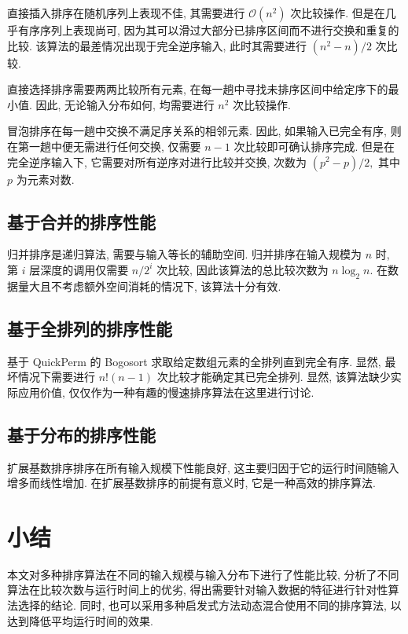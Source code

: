 \documentclass[12pt]{article}
\begin{document}
直接插入排序在随机序列上表现不佳, 其需要进行 $\mathcal{O}(n^2)$ 次比较操作. 但是在几乎有序序列上表现尚可, 因为其可以滑过大部分已排序区间而不进行交换和重复的比较. 该算法的最差情况出现于完全逆序输入, 此时其需要进行 $(n^2 - n) / 2$ 次比较.

直接选择排序需要两两比较所有元素, 在每一趟中寻找未排序区间中给定序下的最小值. 因此, 无论输入分布如何, 均需要进行 $n^2$ 次比较操作.

冒泡排序在每一趟中交换不满足序关系的相邻元素. 因此, 如果输入已完全有序, 则在第一趟中便无需进行任何交换, 仅需要 $n - 1$ 次比较即可确认排序完成. 但是在完全逆序输入下, 它需要对所有逆序对进行比较并交换, 次数为 $(p^2 - p) / 2,$ 其中 $p$ 为元素对数.

\subsection{基于合并的排序性能}

归并排序是递归算法, 需要与输入等长的辅助空间. 归并排序在输入规模为 $n$ 时, 第 $i$ 层深度的调用仅需要 $n / 2^i$ 次比较, 因此该算法的总比较次数为 $n \log_2 n.$ 在数据量大且不考虑额外空间消耗的情况下, 该算法十分有效.

\subsection{基于全排列的排序性能}

基于 QuickPerm 的 Bogosort 求取给定数组元素的全排列直到完全有序. 显然, 最坏情况下需要进行 $n!(n-1)$ 次比较才能确定其已完全排列. 显然, 该算法缺少实际应用价值, 仅仅作为一种有趣的慢速排序算法在这里进行讨论.

\subsection{基于分布的排序性能}

扩展基数排序排序在所有输入规模下性能良好, 这主要归因于它的运行时间随输入增多而线性增加. 在扩展基数排序的前提有意义时, 它是一种高效的排序算法.

\section{小结}

本文对多种排序算法在不同的输入规模与输入分布下进行了性能比较, 分析了不同算法在比较次数与运行时间上的优劣, 得出需要针对输入数据的特征进行针对性算法选择的结论. 同时, 也可以采用多种启发式方法动态混合使用不同的排序算法, 以达到降低平均运行时间的效果.
\end{document}
